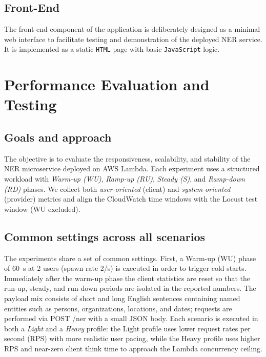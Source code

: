 \documentclass[11pt,a4paper]{article}
\begin{document}
\subsection{Front-End}
The front-end component of the application is deliberately designed as a minimal web interface to facilitate testing and demonstration of the deployed NER service. It is implemented as a static \texttt{HTML} page with basic \texttt{JavaScript} logic. 
\section{Performance Evaluation and Testing}\label{sec:testing}

\subsection{Goals and approach}
The objective is to evaluate the responsiveness, scalability, and stability of the NER microservice deployed on AWS Lambda. Each experiment uses a structured workload with \emph{Warm-up (WU)}, \emph{Ramp-up (RU)}, \emph{Steady (S)}, and \emph{Ramp-down (RD)} phases. We collect both \emph{user-oriented} (client) and \emph{system-oriented} (provider) metrics and align the CloudWatch time windows with the Locust test window (WU excluded).

\subsection{Common settings across all scenarios}
The experiments share a set of common settings. First, a Warm-up (WU) phase of \SI{60}{s} at 2 users (spawn rate 2/s) is executed in order to trigger cold starts. Immediately after the warm-up phase the client statistics are reset so that the run-up, steady, and run-down periods are isolated in the reported numbers. The payload mix consists of short and long English sentences containing named entities such as persons, organizations, locations, and dates; requests are performed via POST /ner with a small JSON body. Each scenario is executed in both a \emph{Light} and a \emph{Heavy} profile: the Light profile uses lower request rates per second (RPS) with more realistic user pacing, while the Heavy profile uses higher RPS and near-zero client think time to approach the Lambda concurrency ceiling.
\end{document}
